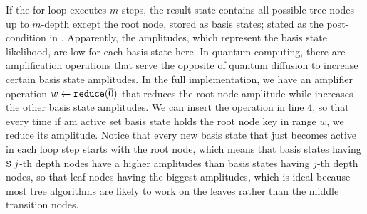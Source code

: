 If the for-loop executes $m$ steps, the result state contains all possible tree nodes up to $m$-depth except the root node, stored as basis states; stated as the post-condition in .
Apparently, the amplitudes, which represent the basis state likelihood, are low for each basis state here. In quantum computing, there are amplification operations that serve the opposite of quantum diffusion to increase certain basis state amplitudes. In the full \qafny implementation, we have an amplifier operation ${w} \xleftarrow{} {\texttt{reduce}(\overline{0})}$ that reduces the root node amplitude while increases the other basis state amplitudes. We can insert the operation in  line 4, so that every time if am active set basis state holds the root node key in range $w$, we reduce its amplitude. Notice that every new basis state that just becomes active in each loop step starts with the root node, which means that basis states having $\texttt{S}\;j$-th depth nodes have a higher amplitudes than basis states having $j$-th depth nodes, so that leaf nodes having the biggest amplitudes, which is ideal because most tree algorithms are likely to work on the leaves rather than the middle transition nodes. 













